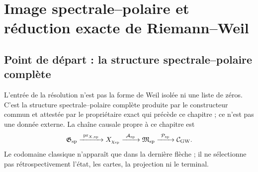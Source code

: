\chapter{Image spectrale--polaire et réduction exacte de Riemann--Weil}

\section{Point de départ : la structure spectrale--polaire complète}

L'entrée de la résolution n'est pas la forme de Weil isolée ni une liste de
zéros. C'est la structure spectrale--polaire complète produite par le constructeur
commun et attestée par le propriétaire exact qui précède ce chapitre ; ce n'est pas
une donnée externe. La chaîne causale propre à ce chapitre est
\begin{equation}\label{eq:pdf2-rh-cadena-procedencia}
 \mathfrak G_{\rm sp}
 \xrightarrow{\ \operatorname{pr}_{X,{\rm sp}}\ }X_{\chi_{\rm sp}}
 \xrightarrow{\ \mathcal A_{\rm sp}\ }\mathfrak M_{\rm sp}
 \xrightarrow{\ \mathcal P_{\rm sp}\ }\mathcal C_{\rm GW}.
\end{equation}
Le codomaine classique n'apparaît que dans la dernière flèche ; il ne sélectionne pas
rétrospectivement l'état, les cartes, la projection ni le terminal.


